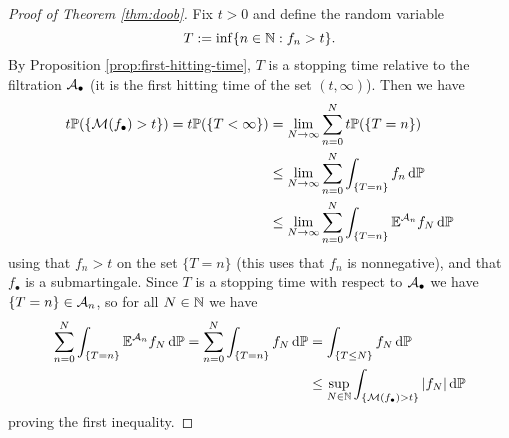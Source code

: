 \begin{proof}[Proof of Theorem \ref{thm:doob}]
  Fix $t > 0$ and define the random variable
  \begin{equation*}
    T :=  \inf\{n \in \mathbb{N} : f_n > t\}.
  \end{equation*}
  By Proposition \ref{prop:first-hitting-time}, $T$ is a stopping time relative to the filtration $\mathcal{A}_{\bullet}$ (it is the first hitting time of the set $(t,\infty)$).
  Then we have
  \begin{equation*} 
    \begin{aligned}
      t\mathbb{P}(\{\mathcal{M}(f_{\bullet}) > t\})
      = t\mathbb{P}(\{T < \infty\})
      &= \lim_{N \to \infty} \sum_{n = 0}^{N} t\mathbb{P}(\{T = n\}) \\
      &\leq \lim_{N \to \infty} \sum_{n = 0}^{N} \int_{\{T = n\}} f_n \, \mathrm{d}\mathbb{P}  \\ 
      &\leq \lim_{N \to \infty} \sum_{n = 0}^{N} \int_{\{T = n\}} \mathbb{E}^{\mathcal{A}_{n}} f_N \, \mathrm{d}\mathbb{P} 
    \end{aligned}
  \end{equation*}
  using that $f_n > t$ on the set $\{T = n\}$ (this uses that $f_{n}$ is nonnegative), and that $f_{\bullet}$ is a submartingale.
  Since $T$ is a stopping time with respect to $\mathcal{A}_{\bullet}$ we have $\{T = n\} \in \mathcal{A}_{n}$, so for all $N \in \mathbb{N}$ we have
  \begin{equation*}
    \begin{aligned}
     \sum_{n = 0}^{N} \int_{\{T = n\}} \mathbb{E}^{\mathcal{A}_{n}} f_N \, \mathrm{d}\mathbb{P} 
    =  \sum_{n = 0}^{N} \int_{\{T = n\}} f_{N} \, \mathrm{d}\mathbb{P} 
    &=  \int_{\{T \leq N\}} f_{N} \, \mathrm{d}\mathbb{P} \\
    &\leq \sup_{N \in \mathbb{N}} \int_{\{\mathcal{M}(f_{\bullet}) > t\}} |f_{N}| \, \mathrm{d}\mathbb{P}
  \end{aligned}
  \end{equation*}
  proving the first inequality.


\end{proof}
